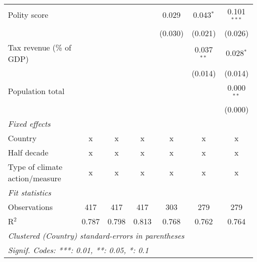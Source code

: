 \begin{tabular}{lcccccc}
   Polity score                                                    &         &                &                & 0.029          & 0.043$^{*}$    & 0.101$^{***}$\\   
                                                                   &         &                &                & (0.030)        & (0.021)        & (0.026)\\   
   Tax revenue (\% of GDP)                                         &         &                &                &                & 0.037$^{**}$   & 0.028$^{*}$\\   
                                                                   &         &                &                &                & (0.014)        & (0.014)\\   
   Population total                                                &         &                &                &                &                & 0.000$^{**}$\\   
                                                                   &         &                &                &                &                & (0.000)\\   
   \emph{Fixed effects}\\
   Country                                                         & x       & x              & x              & x              & x              & x\\  
   Half decade                                                     & x       & x              & x              & x              & x              & x\\  
   Type of climate action/measure                                  & x       & x              & x              & x              & x              & x\\  
   \midrule \emph{Fit statistics}\\
   Observations                                                    & 417     & 417            & 417            & 303            & 279            & 279\\  
   R$^2$                                                           & 0.787   & 0.798          & 0.813          & 0.768          & 0.762          & 0.764\\  
   \midrule
   \multicolumn{7}{l}{\emph{Clustered (Country) standard-errors in parentheses}}\\
   \multicolumn{7}{l}{\emph{Signif. Codes: ***: 0.01, **: 0.05, *: 0.1}}\\
\end{tabular}
\par\endgroup


